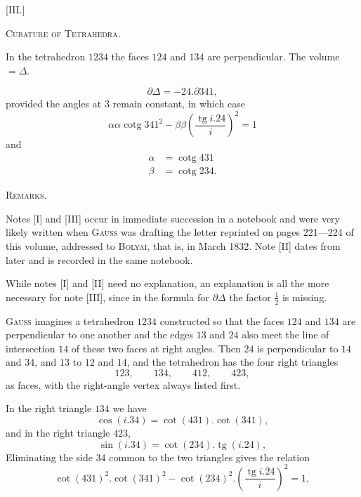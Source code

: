 %
\begin{center}[III.]\end{center}
\begin{center}\textsc{Cubature of Tetrahedra.}\end{center}
In the tetrahedron $1234$ the faces $124$ and $134$ are perpendicular. The volume $=\Delta$.
\begin{center}\end{center}
\[
\partial\Delta=-24.\partial341,
\]
provided the angles at $3$ remain constant, in which case
\[
\alpha\alpha\operatorname{cotg}341^{2}-\beta\beta\left(\frac{\operatorname{tg}i.24}{i}\right)^{2}=1
\]
and
\[
\begin{aligned}
\alpha&=\operatorname{cotg}431\\
\beta&=\operatorname{cotg}234.
\end{aligned}
\]

\begin{center}\textsc{Remarks.}\end{center}
\begingroup\small
Notes [I] and [III] occur in immediate succession in a notebook and were very likely written when \textsc{Gauss} was drafting the letter reprinted on pages 221—224 of this volume, addressed to \textsc{Bolyai}, that is, in March 1832. Note [II] dates from later and is recorded in the same notebook.

While notes [I] and [II] need no explanation, an explanation is all the more necessary for note [III], since in the formula for $\partial\Delta$ the factor $\frac{1}{2}$ is missing.

\textsc{Gauss} imagines a tetrahedron $1234$ constructed so that the faces $124$ and $134$ are perpendicular to one another and the edges $13$ and $24$ also meet the line of intersection $14$ of these two faces at right angles. Then $24$ is perpendicular to $14$ and $34$, and $13$ to $12$ and $14$, and the tetrahedron has the four right triangles
\[
123,\qquad134,\qquad412,\qquad423,
\]
as faces, with the right-angle vertex always listed first.

In the right triangle $134$ we have
\[
\cos(i.34)=\cot(431).\cot(341),
\]
and in the right triangle $423$,
\[
\sin(i.34)=\cot(234).\operatorname{tg}(i.24),
\]
Eliminating the side $34$ common to the two triangles gives the relation
\[
\cot(431)^{2}.\cot(341)^{2}-\cot(234)^{2}.\left(\frac{\operatorname{tg}i.24}{i}\right)^{2}=1,
\]
